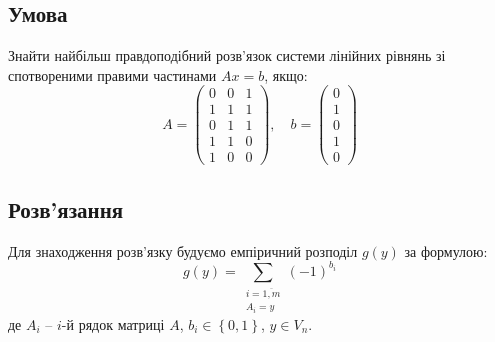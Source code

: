 \chapter{}
\label{chap:3}

\section{Умова}
Знайти найбільш правдоподібний розв'язок системи лінійних рівнянь зі спотвореними правими частинами $Ax = b$, якщо:
\begin{equation*}
    A = \begin{pmatrix}
        0 & 0 & 1 \\
        1 & 1 & 1 \\
        0 & 1 & 1 \\
        1 & 1 & 0 \\
        1 & 0 & 0
    \end{pmatrix}, \quad
    b = \begin{pmatrix}
        0 \\ 1 \\ 0 \\ 1 \\ 0
    \end{pmatrix}
\end{equation*}

\section{Розв'язання}
Для знаходження розв'язку будуємо емпіричний розподіл $g(y)$ за формулою:
\begin{equation*}
    g(y) = \sum\limits_{\substack{i = \overline{1, m} \\ A_i = y}} (-1)^{b_i}
\end{equation*}
де $A_i$ -- $i$-й рядок матриці $A$, $b_{i} \in \left\{0, 1\right\}$, $y \in V_{n}$.

